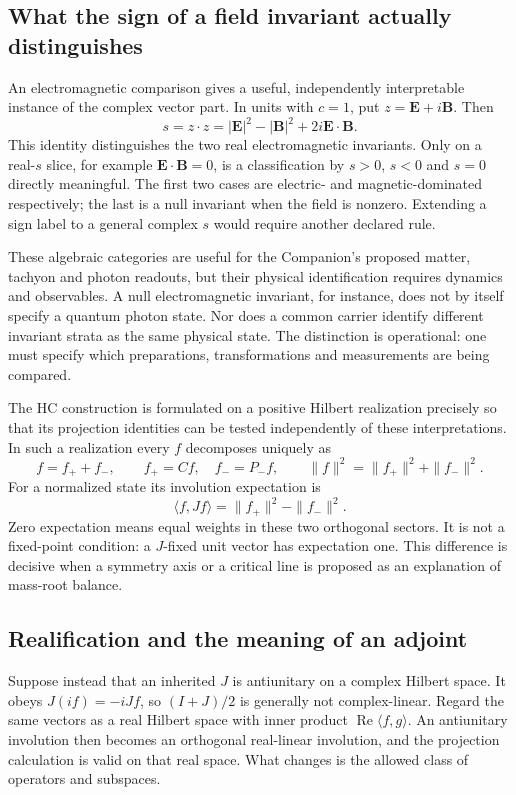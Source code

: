 \subsection{What the sign of a field invariant actually distinguishes}
An electromagnetic comparison gives a useful, independently interpretable
instance of the complex vector part. In units with $c=1$, put
$z=\boldsymbol E+i\boldsymbol B$. Then
\begin{equation}
 s=z\cdot z=|\boldsymbol E|^2-|\boldsymbol B|^2
                 +2i\boldsymbol E\cdot\boldsymbol B.
\end{equation}
This identity distinguishes the two real electromagnetic invariants.
Only on a real-$s$ slice, for example
$\boldsymbol E\cdot\boldsymbol B=0$, is a classification by
$s>0$, $s<0$ and $s=0$ directly meaningful. The first two cases are
electric- and magnetic-dominated respectively; the last is a null
invariant when the field is nonzero. Extending a sign label to a
general complex $s$ would require another declared rule.

These algebraic categories are useful for the Companion's proposed
matter, tachyon and photon readouts, but their physical identification
requires dynamics and observables. A null electromagnetic invariant,
for instance, does not by itself specify a quantum photon state.
Nor does a common carrier identify different invariant strata as the
same physical state. The distinction is operational: one must specify
which preparations, transformations and measurements are being compared.

The HC construction is formulated on a positive Hilbert realization
precisely so that its projection identities can be tested independently
of these interpretations. In such a realization every $f$ decomposes
uniquely as
\begin{equation}
 f=f_++f_-,\qquad f_+=Cf,\quad f_-=P_-f,\qquad
 \|f\|^2=\|f_+\|^2+\|f_-\|^2.
\end{equation}
For a normalized state its involution expectation is
\begin{equation}
 \langle f,Jf\rangle=\|f_+\|^2-\|f_-\|^2.
\end{equation}
Zero expectation means equal weights in these two orthogonal sectors.
It is not a fixed-point condition: a $J$-fixed unit vector has expectation
one. This difference is decisive when a symmetry axis or a critical
line is proposed as an explanation of mass-root balance.

\subsection{Realification and the meaning of an adjoint}
Suppose instead that an inherited $J$ is antiunitary on a complex
Hilbert space. It obeys $J(if)=-iJf$, so $(I+J)/2$ is generally not
complex-linear. Regard the same vectors as a real Hilbert space with
inner product $\operatorname{Re}\langle f,g\rangle$. An antiunitary
involution then becomes an orthogonal real-linear involution, and the
projection calculation is valid on that real space. What changes is
the allowed class of operators and subspaces.

